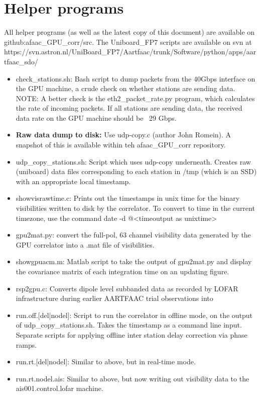 \documentclass {article}
\begin{document}
\section {Helper programs}
All helper programs (as well as the latest copy of this document) are
available on github:afaac_GPU_corr/src. The Uniboard_FP7 scripts are available
on svn at https://svn.astron.nl/UniBoard_FP7/Aartfaac/trunk/Software/python/apps/aartfaac_sdo/

\begin {itemize}
  \item check_stations.sh: Bash script to dump packets from the 40Gbps
    interface on the GPU machine, a crude check on whether stations are
    sending data.\\ NOTE: A better check is the eth2_packet_rate.py program,
    which calculates the rate of incoming packets. If all stations are sending
    data, the received data rate on the GPU machine should be ~29 Gbps.

  \item \textbf{Raw data dump to disk:} Use udp-copy.c (author John Romein). A
    snapshot of this is available within teh afaac_GPU_corr repository.
  
  \item udp_copy_stations.sh: Script which uses udp-copy underneath. Creates
    raw (uniboard) data files corresponding to each station in /tmp (which is
    an SSD) with an appropriate local timestamp.

  \item showvisrawtime.c: Prints out the timestamps in unix time for the
    binary visibilities written to disk by the correlator. To convert to time
    in the current timezone, use the command date -d @<timeoutput as unixtime> 

  \item gpu2mat.py: convert the full-pol, 63 channel visibility data generated
    by the GPU correlator into a .mat file of visibilities.

  \item showgpuacm.m: Matlab script to take the output of gpu2mat.py and
    display the covariance matrix of each integration time on an updating figure.

  \item rsp2gpu.c: Converts dipole level subbanded data as recorded by LOFAR
    infrastructure during earlier AARTFAAC trial observations into 

  \item  run.off.[del|nodel]: Script to run the correlator in offline mode, on the
    output of udp_copy_stations.sh. Takes the timestamp as a command line
    input. Separate scripts for applying offline inter station delay
    correction via phase ramps.

  \item run.rt.[del|nodel]: Similar to above, but in real-time mode.

  \item run.rt.nodel.ais: Similar to above, but now writing out visibility
    data to the ais001.control.lofar machine.

\end{itemize}
\end{document}
